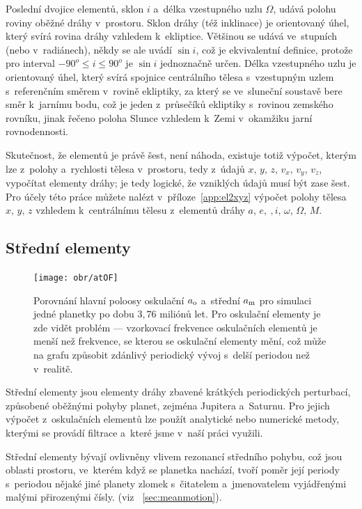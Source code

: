 \documentclass[A4paper, 12pt, oneside, openany]{book}
\begin{document}
Poslední dvojice elementů, sklon $i$ a~délka vzestupného uzlu $\Omega$, udává polohu roviny oběžné dráhy v~prostoru. Sklon dráhy (též inklinace) je orientovaný úhel, který svírá rovina dráhy vzhledem k~ekliptice. Většinou se udává ve~stupních (nebo v~radiánech), někdy se ale uvádí $\sin i$, což je ekvivalentní definice, protože pro interval $-90^o\leq i \leq 90^o$ je $\sin i$ jednoznačně určen. Délka vzestupného uzlu je orientovaný úhel, který svírá spojnice centrálního tělesa s~vzestupným uzlem s~referenčním směrem v~rovině ekliptiky, za který se ve~sluneční soustavě bere směr k~jarnímu bodu, což je jeden z~průsečíků ekliptiky s~rovinou zemského rovníku, jinak řečeno poloha Slunce vzhledem k~Zemi v~okamžiku jarní rovnodennosti.

Skutečnost, že elementů je právě šest, není náhoda, existuje totiž výpočet, kterým lze z~polohy a~rychlosti tělesa v~prostoru, tedy z~údajů $x,\, y,\, z,\, v_x,\, v_y,\, v_z$, vypočítat elementy dráhy; je tedy logické, že vzniklých údajů musí být zase šest. Pro účely této práce můžete nalézt v~příloze~\ref{app:el2xyz} výpočet polohy tělesa $x,\,y,\,z$ vzhledem k~centrálnímu tělesu z~elementů dráhy $a,\,e,~,i,\,\omega,\,\Omega,\,M$.

\subsection{Střední elementy}

\begin{figure}
	\centering
	\texttt{[image: obr/atOF]}
	\caption{Porovnání hlavní poloosy oskulační $a_{\rm o}$ a~střední $a_{\rm m}$ pro simulaci jedné planetky po dobu $3,76$ miliónů let. Pro oskulační elementy je zde vidět problém  --- vzorkovací frekvence oskulačních elementů je menší než frekvence, se kterou se oskulační elementy mění, což může na grafu způsobit zdánlivý periodický vývoj s~delší periodou než v~realitě.} 
	\label{atOF}
\end{figure}

Střední elementy jsou elementy dráhy zbavené krátkých periodických perturbací, způsobené oběžnými pohyby planet, zejména Jupitera a~Saturnu. Pro jejich výpočet z~oskulačních elementů lze použít analytické nebo numerické metody, kterými se provádí filtrace a~které jsme v~naší práci využili. 

Střední elementy bývají ovlivněny vlivem rezonancí středního pohybu, což jsou oblasti prostoru, ve~kterém když se planetka nachází, tvoří poměr její periody s~periodou nějaké jiné planety zlomek s~čitatelem a~jmenovatelem vyjádřenými malými přirozenými čísly. (viz ~\ref{sec:meanmotion}). 
\end{document}
